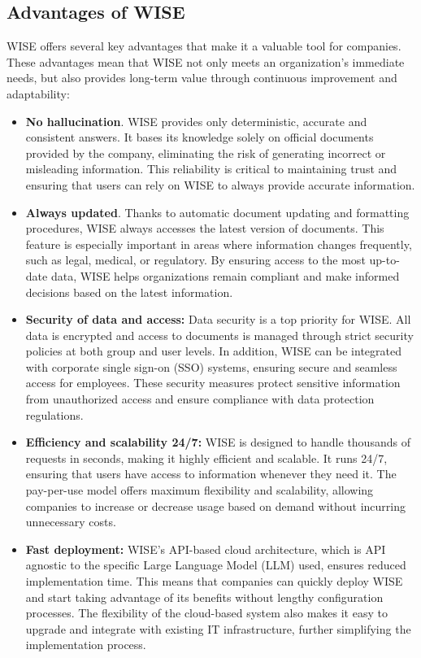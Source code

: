 \subsection{Advantages of WISE}

WISE offers several key advantages that make it a valuable tool for companies. These advantages mean that WISE not only meets an organization's immediate needs, but also provides long-term value through continuous improvement and adaptability:

\begin{itemize}    
    \item \textbf{No hallucination}. WISE provides only deterministic, accurate and consistent answers. It bases its knowledge solely on official documents provided by the company, eliminating the risk of generating incorrect or misleading information. This reliability is critical to maintaining trust and ensuring that users can rely on WISE to always provide accurate information.
    
    \item \textbf{Always updated}. Thanks to automatic document updating and formatting procedures, WISE always accesses the latest version of documents. This feature is especially important in areas where information changes frequently, such as legal, medical, or regulatory. By ensuring access to the most up-to-date data, WISE helps organizations remain compliant and make informed decisions based on the latest information.
    
    \item \textbf{Security of data and access:} Data security is a top priority for WISE. All data is encrypted and access to documents is managed through strict security policies at both group and user levels. In addition, WISE can be integrated with corporate single sign-on (SSO) systems, ensuring secure and seamless access for employees. These security measures protect sensitive information from unauthorized access and ensure compliance with data protection regulations.
    
    \item \textbf{Efficiency and scalability 24/7:} WISE is designed to handle thousands of requests in seconds, making it highly efficient and scalable. It runs 24/7, ensuring that users have access to information whenever they need it. The pay-per-use model offers maximum flexibility and scalability, allowing companies to increase or decrease usage based on demand without incurring unnecessary costs.
    
    \item \textbf{Fast deployment:} WISE's API-based cloud architecture, which is API agnostic to the specific Large Language Model (LLM) used, ensures reduced implementation time. This means that companies can quickly deploy WISE and start taking advantage of its benefits without lengthy configuration processes. The flexibility of the cloud-based system also makes it easy to upgrade and integrate with existing IT infrastructure, further simplifying the implementation process. \cite{hpa2024}
\end{itemize}


